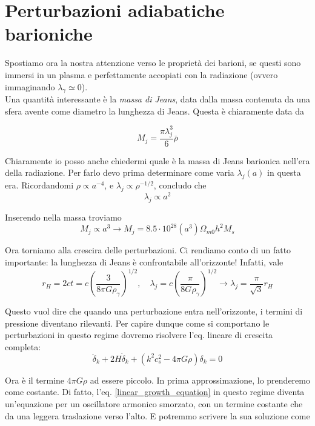 \documentclass{report}
\begin{document}
\section{Perturbazioni adiabatiche barioniche}

Spostiamo ora la nostra attenzione verso le proprietà dei barioni, se questi sono immersi in un plasma e perfettamente accopiati con la radiazione (ovvero immaginando $\lambda_\gamma \simeq 0$). \\
Una quantità interessante è la \emph{massa di Jeans}, data dalla massa contenuta da una sfera avente come diametro la lunghezza di Jeans. Questa è chiaramente data da

\begin{equation}
    M_j = \frac{\pi \lambda^3_j}{6}\bar{\rho}
\end{equation}

Chiaramente io posso anche chiedermi quale è la massa di Jeans barionica nell'era della radiazione. Per farlo devo prima determinare come varia $\lambda_j(a)$ in questa era. Ricordandomi $\rho \propto a^{-4}$, e $\lambda_j \propto \rho^{-1/2}$, concludo che 
\begin{equation}
    \lambda_j \propto a^2
\end{equation}

Inserendo nella massa troviamo
\begin{equation}
    M_j \propto a^3 \rightarrow M_j = 8.5 \cdot 10^{28} (a^3)\Omega_{m0}h^2M_s
\end{equation}

Ora torniamo alla crescira delle perturbazioni. Ci rendiamo conto di un fatto importante: la lunghezza di Jeans è confrontabile all'orizzonte! Infatti, vale 
\begin{equation}
    r_H = 2ct = c\left(\frac{3}{8\pi G \rho_\gamma} \right)^{1/2}, \quad \lambda_j = c\left(\frac{\pi}{8G\rho_\gamma} \right)^{1/2} \rightarrow \lambda_j = \frac{\pi}{\sqrt{3}}r_H 
\end{equation}

Questo vuol dire che quando una perturbazione entra nell'orizzonte, i termini di pressione diventano rilevanti. Per capire dunque come si comportano le perturbazioni in questo regime dovremo risolvere l'eq. lineare di crescita completa: 
\begin{equation}
    \ddot{\delta}_k + 2H\dot{\delta}_k + (k^2c_s^2 - 4\pi G\rho)\delta_k = 0 
\end{equation}

Ora è il termine $4\pi G\rho$ ad essere piccolo. In prima approssimazione, lo prenderemo come costante. Di fatto, l'eq. \ref{linear_growth_equation} in questo regime diventa un'equazione per un oscillatore armonico smorzato, con un termine costante che da una leggera traslazione verso l'alto. E potremmo scrivere la sua soluzione come 
\end{document}
